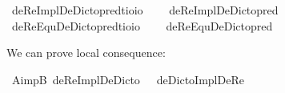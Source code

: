 \begin{isabellebody}
\isamarkupfalse%
\ deReImplDeDicto{\isacharunderscore}pred{\isacharcolon}{\isacharcolon}{\isachardoublequoteopen}{\isacharparenleft}{\isacharprime}t{\isasymRightarrow}io{\isacharparenright}{\isasymRightarrow}io{\isachardoublequoteclose}\ \isanewline
\ \ \ {\isachardoublequoteopen}deReImplDeDicto{\isacharunderscore}pred\ {\isasymtau}\ {\isasymequiv}\ \isactrlbold {\isasymforall}{\isasymalpha}{\isachardot}\ {\isacharparenleft}{\isacharparenleft}{\isasymlambda}{\isasymbeta}{\isachardot}\ \isactrlbold {\isasymbox}{\isacharparenleft}{\isasymalpha}\ {\isasymbeta}{\isacharparenright}{\isacharparenright}\ \isactrlbold {\isasymdown}{\isasymtau}{\isacharparenright}\ \isactrlbold {\isasymrightarrow}\ \isactrlbold {\isasymbox}{\isacharparenleft}{\isacharparenleft}{\isasymlambda}{\isasymbeta}{\isachardot}\ {\isacharparenleft}{\isasymalpha}\ {\isasymbeta}{\isacharparenright}{\isacharparenright}\ \isactrlbold {\isasymdown}{\isasymtau}{\isacharparenright}{\isachardoublequoteclose}\isanewline
{}\isamarkupfalse%
\ deReEquDeDicto{\isacharunderscore}pred{\isacharcolon}{\isacharcolon}{\isachardoublequoteopen}{\isacharparenleft}{\isacharprime}t{\isasymRightarrow}io{\isacharparenright}{\isasymRightarrow}io{\isachardoublequoteclose}\ \isanewline
\ \ \ {\isachardoublequoteopen}deReEquDeDicto{\isacharunderscore}pred\ {\isasymtau}\ {\isasymequiv}\ \isactrlbold {\isasymforall}{\isasymalpha}{\isachardot}\ {\isacharparenleft}{\isacharparenleft}{\isasymlambda}{\isasymbeta}{\isachardot}\ \isactrlbold {\isasymbox}{\isacharparenleft}{\isasymalpha}\ {\isasymbeta}{\isacharparenright}{\isacharparenright}\ \isactrlbold {\isasymdown}{\isasymtau}{\isacharparenright}\ \isactrlbold {\isasymleftrightarrow}\ \isactrlbold {\isasymbox}{\isacharparenleft}{\isacharparenleft}{\isasymlambda}{\isasymbeta}{\isachardot}\ {\isacharparenleft}{\isasymalpha}\ {\isasymbeta}{\isacharparenright}{\isacharparenright}\ \isactrlbold {\isasymdown}{\isasymtau}{\isacharparenright}{\isachardoublequoteclose}%
\begin{isamarkuptext}%
We can prove local consequence:%
\end{isamarkuptext}\isamarkuptrue%
\isamarkupfalse%
\ AimpB{\isacharcolon}\ {\isachardoublequoteopen}{\isasymlfloor}deReImplDeDicto\ {\isacharparenleft}{\isasymtau}{\isacharcolon}{\isacharcolon}{\isasymup}{\isasymzero}{\isacharparenright}\ \isactrlbold {\isasymrightarrow}\ deDictoImplDeRe\ {\isasymtau}{\isasymrfloor}{\isachardoublequoteclose}\isanewline
%
\isadelimproof
\ \ %
\endisadelimproof

\end{isabellebody}

